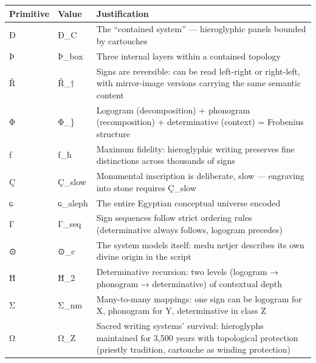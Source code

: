 \documentclass[
  11pt,
  a4paper,
]{article}
\newcounter{none} %
\begin{document}
{\def\LTcaptype{none} %
\begin{longtable}[]{@{}
  >{\raggedright\arraybackslash}p{}
  >{\raggedright\arraybackslash}p{}
  >{\raggedright\arraybackslash}p{}@{}}
\toprule\noalign{}
\begin{minipage}[b]{\linewidth}\raggedright
Primitive
\end{minipage} & \begin{minipage}[b]{\linewidth}\raggedright
Value
\end{minipage} & \begin{minipage}[b]{\linewidth}\raggedright
Justification
\end{minipage} \\
\midrule\noalign{}
\endhead
\bottomrule\noalign{}
\endlastfoot
Ð & Ð\_C & The ``contained system'' --- hieroglyphic panels bounded by
cartouches \\
Þ & Þ\_box & Three internal layers within a contained topology \\
Ř & Ř\_† & Signs are reversible: can be read left-right or right-left,
with mirror-image versions carrying the same semantic content \\
Φ & Φ\_\} & Logogram (decomposition) + phonogram (recomposition) +
determinative (context) = Frobenius structure \\
ƒ & ƒ\_ħ & Maximum fidelity: hieroglyphic writing preserves fine
distinctions across thousands of signs \\
Ç & Ç\_slow & Monumental inscription is deliberate, slow --- engraving
into stone requires Ç\_slow \\
ɢ & ɢ\_aleph & The entire Egyptian conceptual universe encoded \\
Γ & Γ\_seq & Sign sequences follow strict ordering rules (determinative
always follows, logogram precedes) \\
⊙ & ⊙\_c & The system models itself: medu netjer describes its own
divine origin in the script \\
Ħ & Ħ\_2 & Determinative recursion: two levels (logogram → phonogram →
determinative) of contextual depth \\
Σ & Σ\_nm & Many-to-many mappings: one sign can be logogram for X,
phonogram for Y, determinative in class Z \\
Ω & Ω\_Z & Sacred writing systems' survival: hieroglyphs maintained for
3,500 years with topological protection (priestly tradition, cartouche
as winding protection) \\
\end{longtable}
}
\end{document}
